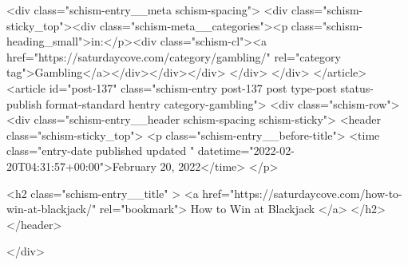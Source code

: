{		<div class="schism-entry__meta schism-spacing">			<div class="schism-sticky_top"><div class="schism-meta__categories"><p class="schism-heading_small">in:</p><div class="schism-cl"><a href="https://saturdaycove.com/category/gambling/" rel="category tag">Gambling</a></div></div></div>		</div>
	</div>
</article>
<article id="post-137" class="schism-entry post-137 post type-post status-publish format-standard hentry category-gambling">
	<div class="schism-row">		<div class="schism-entry__header schism-spacing schism-sticky">			<header class="schism-sticky_top">				<p class="schism-entry__before-title">
					<time class="entry-date published updated " datetime="2022-02-20T04:31:57+00:00">February 20, 2022</time>				</p>

				<h2 class="schism-entry__title" >
					<a href="https://saturdaycove.com/how-to-win-at-blackjack/" rel="bookmark">
						How to Win at Blackjack					</a>
				</h2>
			</header>

					</div>

}
